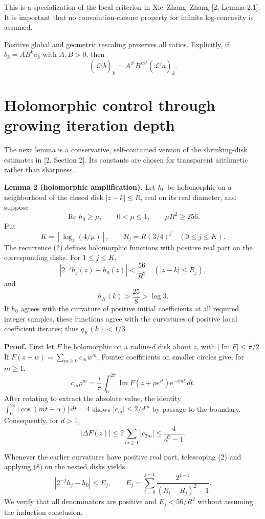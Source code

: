 \documentclass[11pt,a4paper]{article}
\begin{document}
This is a specialization of the local criterion in Xie--Zhang--Zhang
{[}2, Lemma 2.1{]}. It is important that no convolution-closure property
for infinite log-concavity is assumed.

Positive global and geometric rescaling preserves all ratios.
Explicitly, if \(b_k=AB^ka_k\) with \(A,B>0\), then \[
 (\mathcal L^j b)_k=A^{2^j}B^{k2^j}(\mathcal L^j a)_k. \tag{4}
\]

\section{Holomorphic control through growing iteration depth}\label{holomorphic-control-through-growing-iteration-depth}


The next lemma is a conservative, self-contained version of the
shrinking-disk estimates in {[}2, Section 2{]}. Its constants are chosen
for transparent arithmetic rather than sharpness.

\textbf{Lemma 2 (holomorphic amplification).} Let \(h_0\) be holomorphic
on a neighborhood of the closed disk \(|z-k|\leq R\), real on its real
diameter, and suppose \[
 \operatorname{Re}h_0\geq\mu,\qquad
 0<\mu\leq1,\qquad \mu R^2\geq256. \tag{5}
\] Put \[
 K=\left\lceil\log_2(4/\mu)\right\rceil,
 \qquad R_j=R(3/4)^j\quad(0\leq j\leq K).
\] The recurrence (2) defines holomorphic functions with positive real
part on the corresponding disks. For \(1\leq j\leq K\), \[
 \left|2^{-j}h_j(z)-h_0(z)\right|<\frac{56}{R^2}
 \quad (|z-k|\leq R_j), \tag{6}
\] and \[
 h_K(k)>\frac{25}{8}>\log3. \tag{7}
\] If \(h_0\) agrees with the curvature of positive initial coefficients
at all required integer samples, these functions agree with the
curvatures of positive local coefficient iterates; thus \(q_K(k)<1/3\).

\textbf{Proof.} First let \(F\) be holomorphic on a radius-\(d\) disk
about \(z\), with \(|\operatorname{Im}F|\leq\pi/2\). If
\(F(z+w)=\sum_{m\geq0}c_mw^m\), Fourier coefficients on smaller circles
give, for \(m\geq1\), \[
 c_m\rho^m=\frac{i}{\pi}\int_0^{2\pi}
 \operatorname{Im}F(z+\rho e^{it})e^{-imt}\,dt.
\] After rotating to extract the absolute value, the identity
\(\int_0^{2\pi}|\cos(mt+\alpha)|\,dt=4\) shows \(|c_m|\leq2/d^m\) by
passage to the boundary. Consequently, for \(d>1\), \[
 |\Delta F(z)|\leq2\sum_{m\geq1}|c_{2m}|
 \leq\frac4{d^2-1}. \tag{8}
\]

Whenever the earlier curvatures have positive real part, telescoping (2)
and applying (8) on the nested disks yields \[
 |2^{-j}h_j-h_0|\leq E_j,
 \qquad
 E_j=\sum_{i=0}^{j-1}
 \frac{2^{1-i}}{(R_i-R_j)^2-1}. \tag{9}
\] We verify that all denominators are positive and \(E_j<56/R^2\)
without assuming the induction conclusion.
\end{document}
